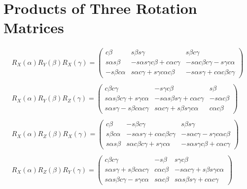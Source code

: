 \documentclass[10pt, letterpaper]{report}
\begin{document}
\section*{Products of Three Rotation Matrices}\begin{eqnarray*}R_{X}(\alpha)R_{Y}(\beta)R_{X}(\gamma)=\begin{pmatrix}
 c \beta &  s \beta s \gamma &  s \beta c \gamma \\ 
 s \alpha s \beta & - s \alpha s \gamma c \beta +  c \alpha c \gamma & - s \alpha c \beta c \gamma -  s \gamma c \alpha \\ 
- s \beta c \alpha &  s \alpha c \gamma +  s \gamma c \alpha c \beta & - s \alpha s \gamma +  c \alpha c \beta c \gamma 
\end{pmatrix} \\ \\ 
R_{X}(\alpha)R_{Y}(\beta)R_{Z}(\gamma)=\begin{pmatrix}
 c \beta c \gamma & - s \gamma c \beta &  s \beta \\ 
 s \alpha s \beta c \gamma +  s \gamma c \alpha & - s \alpha s \beta s \gamma +  c \alpha c \gamma & - s \alpha c \beta \\ 
 s \alpha s \gamma -  s \beta c \alpha c \gamma &  s \alpha c \gamma +  s \beta s \gamma c \alpha &  c \alpha c \beta 
\end{pmatrix} \\ \\ 
R_{X}(\alpha)R_{Z}(\beta)R_{X}(\gamma)=\begin{pmatrix}
 c \beta & - s \beta c \gamma &  s \beta s \gamma \\ 
 s \beta c \alpha & - s \alpha s \gamma +  c \alpha c \beta c \gamma & - s \alpha c \gamma -  s \gamma c \alpha c \beta \\ 
 s \alpha s \beta &  s \alpha c \beta c \gamma +  s \gamma c \alpha & - s \alpha s \gamma c \beta +  c \alpha c \gamma 
\end{pmatrix} \\ \\ 
R_{X}(\alpha)R_{Z}(\beta)R_{Y}(\gamma)=\begin{pmatrix}
 c \beta c \gamma & - s \beta &  s \gamma c \beta \\ 
 s \alpha s \gamma +  s \beta c \alpha c \gamma &  c \alpha c \beta & - s \alpha c \gamma +  s \beta s \gamma c \alpha \\ 
 s \alpha s \beta c \gamma -  s \gamma c \alpha &  s \alpha c \beta &  s \alpha s \beta s \gamma +  c \alpha c \gamma 
\end{pmatrix} \\ \\ 

\end{eqnarray*}
\end{document}
